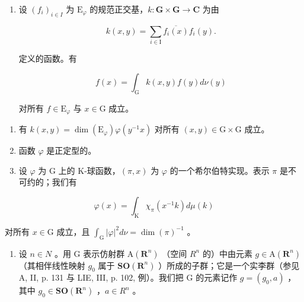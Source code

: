 \begin{enumerate}
\def\labelenumi{\alph{enumi})}
\setcounter{enumi}{3}
\tightlist
\item
  设 \((f_i)_{i\in I}\) 为 \(\mathrm{E}_{\varphi}\) 的规范正交基，\(k\colon \mathbf{G}\times \mathbf{G}\to \mathbf{C}\) 为由

\[
k (x, y) = \sum_ {i \in \mathrm{I}} \overline {{f _ {i} (x)}} f _ {i} (y).
\]

定义的函数。有

\[
f (x) = \int_ {\mathrm{G}} k (x, y) f (y) d \nu (y)
\]

对所有 \(f \in \mathrm{E}_{\varphi}\) 与 \(x \in \mathrm{G}\) 成立。

\end{enumerate}

\begin{enumerate}
\def\labelenumi{\alph{enumi})}
\setcounter{enumi}{4}
\item
  有 \(k(x,y)=\dim(\mathrm{E}_{\varphi})\varphi(y^{-1}x)\) 对所有 \((x,y)\in\mathrm{G}\times\mathrm{G}\) 成立。
\item
  函数 \(\varphi\) 是正定型的。
\item
  设 \(\varphi\) 为 G 上的 K-球函数，\((\pi, x)\) 为 \(\varphi\) 的一个希尔伯特实现。表示 \(\pi\) 是不可约的；我们有
\end{enumerate}

\[
\varphi (x) = \int_ {\mathrm{K}} \chi_ {\pi} (x ^ {- 1} k) d \mu (k)
\]

对所有 \(x \in \mathrm{G}\) 成立，且 \(\int_{\mathrm{G}} |\varphi|^2 d\nu = \dim(\pi)^{-1}\) 。

\begin{enumerate}
\def\labelenumi{\arabic{enumi})}
\setcounter{enumi}{29}
\tightlist
\item
  设 \(n \in N\) 。用 G 表示仿射群 \(\mathrm{A}(\mathbf{R}^{n})\) （空间 \(R^{n}\) 的）中由元素 \(g \in \mathrm{A}(\mathbf{R}^{n})\) （其相伴线性映射 \(g_{0}\) 属于 \(\mathbf{SO}(\mathbf{R}^{n})\) ）所成的子群；它是一个实李群（参见 A, II, p. 131 与 LIE, III, p. 102, 例）。我们把 G 的元素记作 \(g = (g_{0}, a)\) ，其中 \(g_{0} \in \mathbf{SO}(\mathbf{R}^{n})\) ，\(a \in R^{n}\) 。
\end{enumerate}

